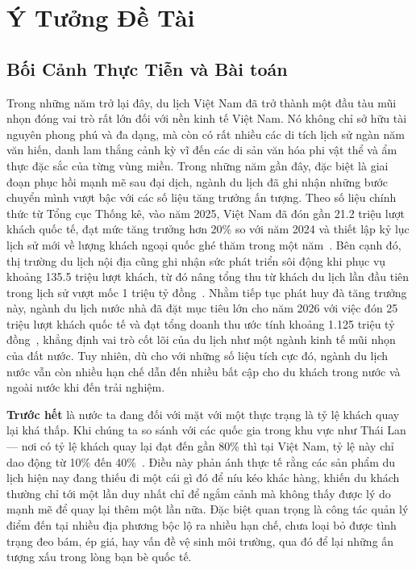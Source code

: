 \section{Ý Tưởng Đề Tài}

\subsection{Bối Cảnh Thực Tiễn và Bài toán}
\contrib

Trong những năm trở lại đây, du lịch Việt Nam đã trở thành một đầu tàu mũi nhọn
đóng vai trò rất lớn đối với nền kinh tế Việt Nam. Nó không chỉ  sở hữu tài nguyên phong phú và đa dạng,
mà còn có rất nhiều các di tích lịch sử ngàn năm văn hiến, danh lam thắng cảnh kỳ
vĩ đến các di sản văn hóa phi vật thể và ẩm thực đặc sắc của
từng vùng miền. Trong những năm gần đây, đặc biệt là giai đoạn phục
hồi mạnh mẽ sau đại dịch, ngành du lịch đã ghi nhận những bước chuyển
mình vượt bậc với các số liệu tăng trưởng ấn tượng. Theo số
liệu chính thức từ Tổng cục Thống kê, vào năm 2025, Việt Nam đã đón
gần 21.2 triệu lượt khách quốc tế, đạt mức tăng trưởng hơn 20\% so
với năm 2024 và thiết lập kỷ lục lịch sử mới về lượng khách ngoại
quốc ghé thăm trong một năm~\cite{gso2025}. Bên cạnh đó, thị trường
du lịch nội địa cũng ghi nhận sức phát triển sôi động khi
phục vụ khoảng 135.5 triệu lượt khách, từ đó nâng tổng thu từ khách
du lịch lần đầu tiên trong lịch sử vượt mốc 1 triệu tỷ đồng~\cite{vnat2025}.
Nhằm tiếp tục phát huy đà tăng trưởng này, ngành du lịch nước nhà đã
đặt mục tiêu lớn cho năm 2026 với việc đón 25 triệu lượt khách quốc
tế và đạt tổng doanh thu ước tính khoảng 1.125 triệu tỷ đồng~\cite{vnat2026},
khẳng định vai trò cốt lõi của du lịch như một ngành kinh tế mũi
nhọn của đất nước. Tuy nhiên, dù cho với những số liệu tích cực đó, ngành du lịch
nước vẫn còn nhiều hạn chế dẫn đến nhiều bất cập cho du khách trong nước và ngoài nước
khi đến trải nghiệm.

\textbf{Trước hết} là nước ta đang đối với mặt với một thực trạng là tỷ lệ khách quay lại khá thấp. Khi chúng ta
so sánh với các quốc gia trong khu vực như Thái Lan --- nơi có tỷ lệ
khách quay lại đạt đến gần 80\% thì tại Việt Nam, tỷ lệ này chỉ dao
động từ 10\% đến 40\%~\cite{pata2020}. Điều này phản ánh thực tế rằng
các sản phẩm du lịch hiện nay đang thiếu đi một cái gì đó để níu kéo khác hàng, khiến du khách thường chỉ tới một
lần duy nhất chỉ để ngắm cảnh mà không thấy được lý do mạnh mẽ để quay
lại thêm một lần nữa. Đặc biệt quan trọng là công tác quản lý điểm
đến tại nhiều địa phương bộc lộ ra nhiều hạn chế, chưa loại bỏ được
tình trạng đeo bám, ép giá, hay vấn đề vệ sinh môi trường, qua đó
để lại những ấn tượng xấu trong lòng bạn bè quốc tế.

